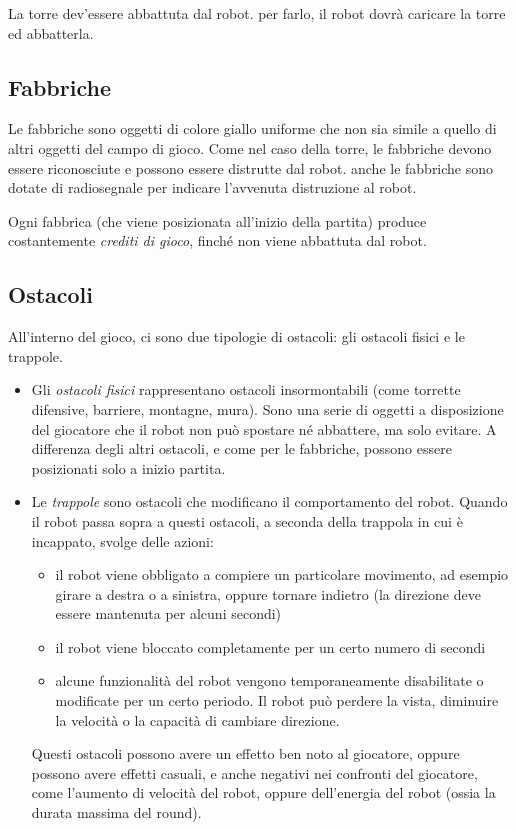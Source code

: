 La torre dev'essere abbattuta dal robot. per farlo, il robot dovrà caricare la torre ed abbatterla.

\subsection*{Fabbriche} Le fabbriche sono oggetti di colore giallo uniforme che non sia simile a quello di altri oggetti del campo di gioco. Come nel caso della torre, le fabbriche devono essere riconosciute e possono essere distrutte dal robot. anche le fabbriche sono dotate di radiosegnale per indicare l'avvenuta distruzione al robot.

Ogni fabbrica (che viene posizionata all'inizio della partita) produce costantemente \emph{crediti di gioco}, finché non viene abbattuta dal robot.

\subsection*{Ostacoli} All'interno del gioco, ci sono due tipologie di ostacoli: gli ostacoli fisici e le trappole.
	\begin{itemize}
	\item Gli \emph{ostacoli fisici} rappresentano ostacoli insormontabili (come torrette difensive, barriere, montagne, mura). Sono una serie di oggetti a disposizione del giocatore che il robot non può spostare né abbattere, ma solo evitare. A differenza degli altri ostacoli, e come per le fabbriche, possono essere posizionati solo a inizio partita.
	\item Le \emph{trappole} sono ostacoli che modificano il comportamento del robot. Quando il robot passa sopra a questi ostacoli, a seconda della trappola in cui è incappato, svolge delle azioni:
		\begin{itemize}
		\item il robot viene obbligato a compiere un particolare movimento, ad esempio girare a destra o a sinistra, oppure tornare indietro (la direzione deve essere mantenuta per alcuni secondi)
		\item il robot viene bloccato completamente per un certo numero di secondi
		\item alcune funzionalità del robot vengono temporaneamente disabilitate o modificate per un certo periodo. Il robot può perdere la vista, diminuire la velocità o la capacità di cambiare direzione.
		\end{itemize}
	Questi ostacoli possono avere un effetto ben noto al giocatore, oppure possono avere effetti casuali, e anche negativi nei confronti del giocatore, come l'aumento di velocità del robot, oppure dell'energia del robot (ossia la durata massima del round).
	\end{itemize}

